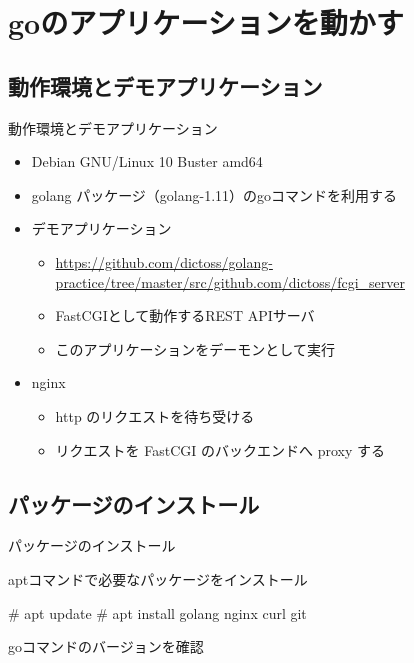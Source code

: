 \section{goのアプリケーションを動かす}

\subsection{動作環境とデモアプリケーション}

\begin{frame}[containsverbatim]{動作環境とデモアプリケーション}
  \begin{itemize}
  \item Debian GNU/Linux 10 Buster amd64
  \item golang パッケージ（golang-1.11）のgoコマンドを利用する
  \item デモアプリケーション
    \begin{itemize}
    \item \url{https://github.com/dictoss/golang-practice/tree/master/src/github.com/dictoss/fcgi_server}
    \item FastCGIとして動作するREST APIサーバ
    \item このアプリケーションをデーモンとして実行
    \end{itemize}
  \item nginx
    \begin{itemize}
    \item http のリクエストを待ち受ける
    \item リクエストを FastCGI のバックエンドへ proxy する
    \end{itemize}
  \end{itemize}
\end{frame}


\subsection{パッケージのインストール}

\begin{frame}[containsverbatim]{パッケージのインストール}

aptコマンドで必要なパッケージをインストール

\begin{commandline}
# apt update
# apt install golang nginx curl git
\end{commandline}

goコマンドのバージョンを確認


\end{frame}


